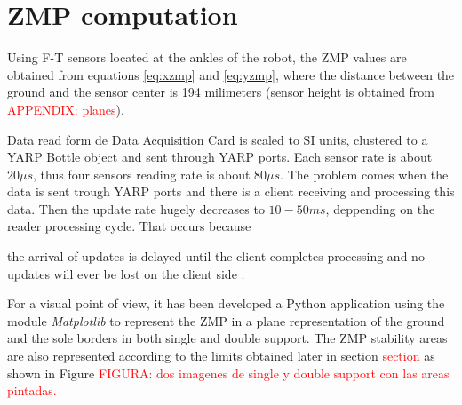 \section{ZMP computation}
Using F-T sensors located at the ankles of the robot, the ZMP values are obtained from equations \eqref{eq:xzmp} and \eqref{eq:yzmp}, where the distance between the ground and the sensor center is 194 milimeters (sensor height is obtained from \textcolor{red}{APPENDIX: planes}).

Data read form de Data Acquisition Card is scaled to SI units, clustered to a YARP Bottle object and sent through YARP ports. Each sensor rate is about $20 \mu s$, thus four sensors reading rate is about $80 \mu s$. The problem comes when the data is sent trough YARP ports and there is a client receiving and processing this data. Then the update rate hugely decreases to $10 - 50 ms$, deppending on the reader processing cycle. That occurs because 

the arrival of updates is delayed until the client completes processing and no updates will ever be lost on the client side \cite{Yarp2006}.


For a visual point of view, it has been developed a Python application using the module \textit{Matplotlib} to represent the ZMP in a plane representation of the ground and the sole borders in both single and double support. The ZMP stability areas are also represented according to the limits obtained later in section \textcolor{red}{section} as shown in Figure \textcolor{red}{FIGURA: dos imagenes de single y double support con las areas pintadas.}